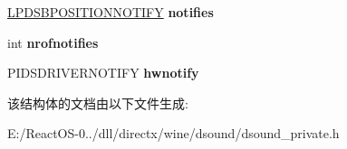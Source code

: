 \begin{DoxyCompactItemize}
\hyperlink{struct___d_s_b_p_o_s_i_t_i_o_n_n_o_t_i_f_y}{L\+P\+D\+S\+B\+P\+O\+S\+I\+T\+I\+O\+N\+N\+O\+T\+I\+FY} {\bfseries notifies}
\item 
\mbox{\label{struct_i_direct_sound_capture_buffer_impl_a5d604d0bc96ba05dc420982984942763}} 
int {\bfseries nrofnotifies}
\item 
\mbox{\label{struct_i_direct_sound_capture_buffer_impl_abdebd2fc07f2459b483a7f17072cc97d}} 
P\+I\+D\+S\+D\+R\+I\+V\+E\+R\+N\+O\+T\+I\+FY {\bfseries hwnotify}
\end{DoxyCompactItemize}


该结构体的文档由以下文件生成\+:\begin{DoxyCompactItemize}
\item 
E\+:/\+React\+O\+S-\/0../dll/directx/wine/dsound/dsound\+\_\+private.\+h\end{DoxyCompactItemize}
